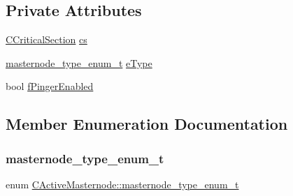 \subsection*{Private Attributes}
\begin{DoxyCompactItemize}
\item 
\mbox{\hyperlink{sync_8h_a37a4692b2d517f2843655ca11af7668a}{C\+Critical\+Section}} \mbox{\hyperlink{class_c_active_masternode_adfab8da076db5b2826fee5ee7d3b3ee0}{cs}}
\item 
\mbox{\hyperlink{class_c_active_masternode_a5fe600c379008561204e609316427bb4}{masternode\+\_\+type\+\_\+enum\+\_\+t}} \mbox{\hyperlink{class_c_active_masternode_a4f641510c0dda9185e86847511816a95}{e\+Type}}
\item 
bool \mbox{\hyperlink{class_c_active_masternode_a5af230132390559891f804f62c0de808}{f\+Pinger\+Enabled}}
\end{DoxyCompactItemize}


\subsection{Member Enumeration Documentation}
\mbox{\label{class_c_active_masternode_a5fe600c379008561204e609316427bb4}} 
\subsubsection{\texorpdfstring{masternode\+\_\+type\+\_\+enum\+\_\+t}{masternode\_type\_enum\_t}}
{\footnotesize\ttfamily enum \mbox{\hyperlink{class_c_active_masternode_a5fe600c379008561204e609316427bb4}{C\+Active\+Masternode\+::masternode\+\_\+type\+\_\+enum\+\_\+t}}}

